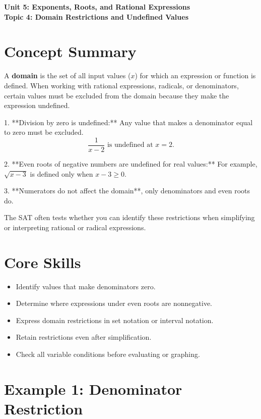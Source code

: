 \documentclass[12pt]{article}
\begin{document}
\begin{center}
    \LARGE \textbf{Unit 5: Exponents, Roots, and Rational Expressions} \\[6pt]
    \Large \textbf{Topic 4: Domain Restrictions and Undefined Values}
\end{center}

\vspace{1em}

\section*{Concept Summary}

A \textbf{domain} is the set of all input values (\(x\)) for which an expression or function is defined.  
When working with rational expressions, radicals, or denominators, certain values must be excluded from the domain because they make the expression undefined.

1. **Division by zero is undefined:**  
   Any value that makes a denominator equal to zero must be excluded.
   \[
   \frac{1}{x-2} \text{ is undefined at } x = 2.
   \]

2. **Even roots of negative numbers are undefined for real values:**  
   For example, \(\sqrt{x-3}\) is defined only when \(x - 3 \ge 0\).

3. **Numerators do not affect the domain**, only denominators and even roots do.

The SAT often tests whether you can identify these restrictions when simplifying or interpreting rational or radical expressions.

\section*{Core Skills}
\begin{itemize}
  \item Identify values that make denominators zero.
  \item Determine where expressions under even roots are nonnegative.
  \item Express domain restrictions in set notation or interval notation.
  \item Retain restrictions even after simplification.
  \item Check all variable conditions before evaluating or graphing.
\end{itemize}

\section*{Example 1: Denominator Restriction}
\end{document}

